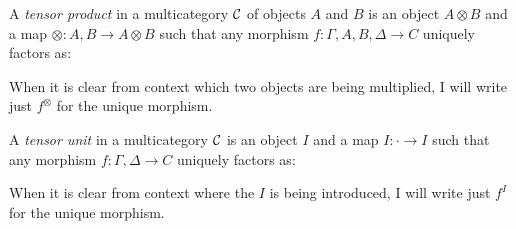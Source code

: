 \begin{definition}\label{def:tensor-product}
  A \emph{tensor product} in a multicategory $\mathcal C$ of objects $A$ and $B$ is an
  object $A \otimes B$ and a map ${\otimes} : A, B \to A \otimes B$ such that
  any morphism $f : \Gamma, A, B, \Delta \to C$ uniquely factors as:


  When it is clear from context which two objects are being multiplied, I will
  write just $f^{\otimes}$ for the unique morphism.
\end{definition}

\begin{definition}\label{def:tensor-unit}
  A \emph{tensor unit} in a multicategory $\mathcal C$ is an object $I$ and a map
  $I : {\cdot} \to I$ such that any morphism
  $f : \Gamma, \Delta \to C$ uniquely factors as:


  When it is clear from context where the $I$ is being introduced, I will
  write just $f^I$ for the unique morphism.
\end{definition}

